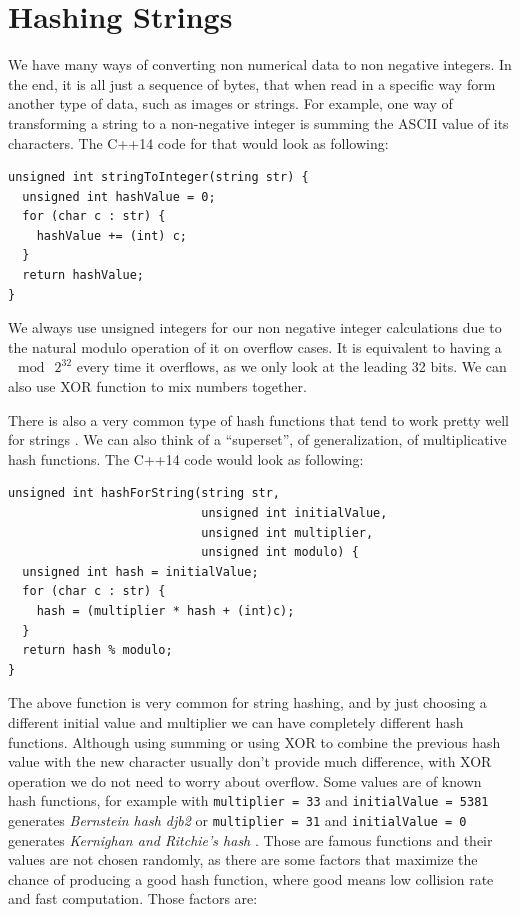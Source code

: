 \section{Hashing Strings}

We have many ways of converting non numerical data to non negative integers. In the end, it is all just a sequence of bytes, that when read in a specific way form another type of data, such as images or strings. For example, one way of transforming a string to a non-negative integer is summing the ASCII value of its characters. The C++14 code for that would look as following:

\begin{lstlisting}
unsigned int stringToInteger(string str) {
  unsigned int hashValue = 0;
  for (char c : str) {
    hashValue += (int) c;
  }
  return hashValue;
}
\end{lstlisting}

We always use unsigned integers for our non negative integer calculations due to the natural modulo operation of it on overflow cases. It is equivalent to having a \( \mod \ 2^{32} \) every time it overflows, as we only look at the leading 32 bits. We can also use XOR function to mix numbers together. 

There is also a very common type of hash functions that tend to work pretty well for strings \citep{DragonHashFunc}. We can also think of a ``superset'', of generalization, of multiplicative hash functions. The C++14 code would look as following:

\begin{lstlisting}
unsigned int hashForString(string str,
                           unsigned int initialValue,
                           unsigned int multiplier,
                           unsigned int modulo) {
  unsigned int hash = initialValue;
  for (char c : str) {
    hash = (multiplier * hash + (int)c);
  }
  return hash % modulo;
}
\end{lstlisting}

The above function is very common for string hashing, and by just choosing a different initial value and multiplier we can have completely different hash functions. Although using summing or using XOR to combine the previous hash value with the new character usually don't provide much difference, with XOR operation we do not need to worry about overflow. Some values are of known hash functions, for example with \texttt{multiplier = 33} and \texttt{initialValue = 5381} generates \textit{Bernstein hash djb2} \citep{BernsteinHash} or \texttt{multiplier = 31} and \texttt{initialValue = 0} generates \textit{Kernighan and Ritchie's hash} \citep{KernighanHash}. Those are famous functions and their values are not chosen randomly, as there are some factors that maximize the chance of producing a good hash function, where good means low collision rate and fast computation. Those factors are:

